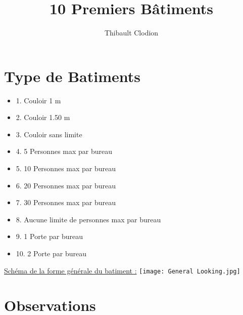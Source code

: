 \documentclass[12pt]{article}
\title{10 Premiers Bâtiments}
\author{Thibault Clodion}
\begin{document}
\maketitle %

\section{Type de Batiments}

\begin{itemize}

\item 1. Couloir 1 m
\item 2. Couloir 1.50 m
\item 3. Couloir sans limite
\item 4. 5 Personnes max par bureau
\item 5. 10 Personnes max par bureau
\item 6. 20 Personnes max par bureau
\item 7. 30 Personnes max par bureau
\item 8. Aucune limite de personnes max par bureau
\item 9. 1 Porte par bureau
\item 10. 2 Porte par bureau

\end{itemize}

\underline{Schéma de la forme générale du batiment :}\newline
\texttt{[image: General Looking.jpg]}

\section{Observations}
\end{document}
